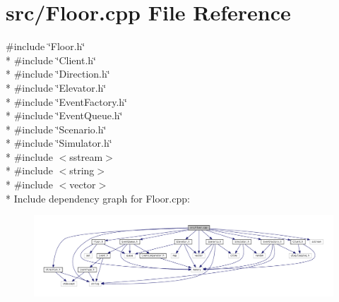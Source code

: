 \section{src/\+Floor.cpp File Reference}
\label{_floor_8cpp}
{\ttfamily \#include \char`\"{}Floor.\+h\char`\"{}}\\*
{\ttfamily \#include \char`\"{}Client.\+h\char`\"{}}\\*
{\ttfamily \#include \char`\"{}Direction.\+h\char`\"{}}\\*
{\ttfamily \#include \char`\"{}Elevator.\+h\char`\"{}}\\*
{\ttfamily \#include \char`\"{}Event\+Factory.\+h\char`\"{}}\\*
{\ttfamily \#include \char`\"{}Event\+Queue.\+h\char`\"{}}\\*
{\ttfamily \#include \char`\"{}Scenario.\+h\char`\"{}}\\*
{\ttfamily \#include \char`\"{}Simulator.\+h\char`\"{}}\\*
{\ttfamily \#include $<$sstream$>$}\\*
{\ttfamily \#include $<$string$>$}\\*
{\ttfamily \#include $<$vector$>$}\\*
Include dependency graph for Floor.\+cpp\+:\nopagebreak
\begin{figure}[H]
\begin{center}
\leavevmode
\includegraphics[width=350pt]{_floor_8cpp__incl}
\end{center}
\end{figure}
